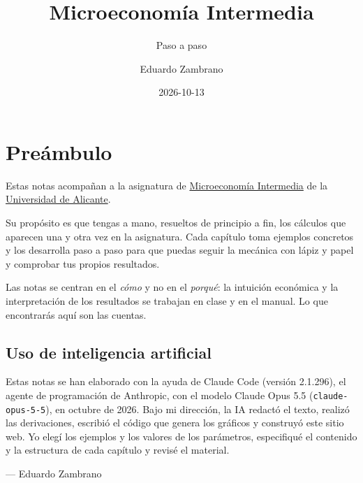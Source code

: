 \documentclass[
  11pt,
  a4paper,
]{report}
\title{Microeconomía Intermedia}
\subtitle{Paso a paso}
\author{Eduardo Zambrano}
\date{2026-10-13}
\renewcommand*\contentsname{Table of contents}
\newcommand\contentsname{Table of contents}
\begin{document}
\maketitle

\renewcommand*\contentsname{Tabla de Contenidos}
{
\hypersetup{linkcolor=}
\setcounter{tocdepth}{2}
\tableofcontents
}


\chapter*{Preámbulo}\label{preuxe1mbulo}


Estas notas acompañan a la asignatura de
\href{https://cvnet.cpd.ua.es/Guia-Docente/GuiaDocente/Index?wlengua=es&wcodasi=22014&scaca=2026-27\#}{Microeconomía
Intermedia} de la \href{https://www.ua.es/}{Universidad de Alicante}.

Su propósito es que tengas a mano, resueltos de principio a fin, los
cálculos que aparecen una y otra vez en la asignatura. Cada capítulo
toma ejemplos concretos y los desarrolla paso a paso para que puedas
seguir la mecánica con lápiz y papel y comprobar tus propios resultados.

Las notas se centran en el \emph{cómo} y no en el \emph{porqué}: la
intuición económica y la interpretación de los resultados se trabajan en
clase y en el manual. Lo que encontrarás aquí son las cuentas.

\section*{Uso de inteligencia
artificial}\label{uso-de-inteligencia-artificial}


Estas notas se han elaborado con la ayuda de Claude Code (versión
2.1.296), el agente de programación de Anthropic, con el modelo Claude
Opus 5.5 (\texttt{claude-opus-5-5}), en octubre de 2026. Bajo mi
dirección, la IA redactó el texto, realizó las derivaciones, escribió el
código que genera los gráficos y construyó este sitio web. Yo elegí los
ejemplos y los valores de los parámetros, especifiqué el contenido y la
estructura de cada capítulo y revisé el material.

--- Eduardo Zambrano
\end{document}
